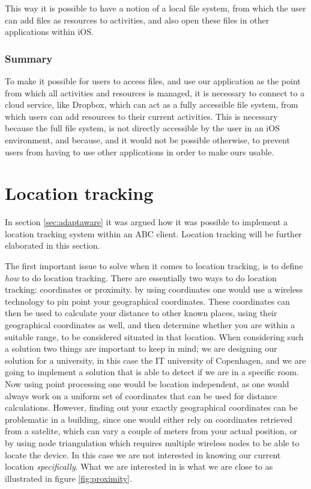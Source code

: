 This way it is possible to have a notion of a local file system, from which the user can add files as resources to activities, and also open these files in other applications within iOS.

\subsubsection{Summary}
To make it possible for users to access files, and use our application as the point from which all activities and resources is managed, it is necessary to connect to a cloud service, like Dropbox, which can act as a fully accessible file system, from which users can add resources to their current activities. This is necessary because the full file system, is not directly accessible by the user in an iOS environment, and because, and it would not be possible otherwise, to prevent users from having to use other applications in order to make ours usable.

\section{Location tracking}
In section \ref{sec:adaptaware} it was argued how it was possible to implement a location tracking system within an ABC client. Location tracking will be further elaborated in this section.

The first important issue to solve when it comes to location tracking, is to define \emph{how} to do location tracking. There are essentially two ways to do location tracking: coordinates or proximity. by using coordinates one would use a wireless technology to pin point your geographical coordinates. These coordinates can then be used to calculate your distance to other known places, using their geographical coordinates as well, and then determine whether you are within a suitable range, to be considered situated in that location. When considering such a solution two things are important to keep in mind; we are designing our solution for a university, in this case the IT university of Copenhagen, and we are going to implement a solution that is able to detect if we are in a specific room. Now using point processing one would be location independent, as one would always work on a uniform set of coordinates that can be used for distance calculations. However, finding out your exactly geographical coordinates can be problematic in a building, since one would either rely on coordinates retrieved from a satelite, which can vary a couple of meters from your actual position, or by using node triangulation which requires multiple wireless nodes to be able to locate the device. In this case we are not interested in knowing our current location \emph{specifically}. What we are interested in is what we are close to as illustrated in figure \ref{fig:proximity}.

